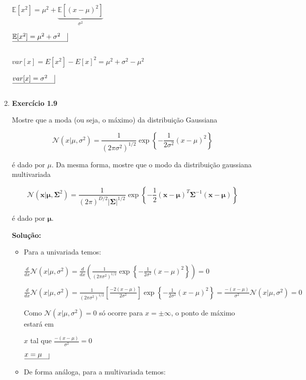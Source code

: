 \begin{enumerate}
$\mathbb{E}[x^2] =\mu^2 + \underbrace{\mathbb{E}[(x-\mu)^2]}_{\sigma^2}$

$\underline{ \mathbb{E}[x^2] =\mu^2 + \sigma^2 \quad} \vline$

$ $

$var[x]=E[x^2]-E[x]^2=\mu^2+\sigma^2-\mu^2$

$\underline{var[x]=\sigma^2 \quad} \vline$

$ $


\item \textbf{Exercício 1.9} \par

Mostre que a moda (ou seja, o máximo) da distribuição Gaussiana 

$$\mathcal{N}(x | \mu, \sigma^2)= \frac{1}{(2\pi\sigma^2)^{1/2}}\exp\left\{ -\frac{1}{2\sigma^2}(x - \mu)^2 \right\}$$

é dado por $\mu$. Da mesma forma, mostre que o modo da distribuição gaussiana multivariada 

$$\mathcal{N}(\boldsymbol{x} | \boldsymbol{\mu}, \boldsymbol{\Sigma}^2)= \frac{1}{(2\pi)^{D/2}|\boldsymbol{\Sigma}|^{1/2}}\exp\left\{ -\frac{1}{2}(\boldsymbol{x} - \boldsymbol{\mu})^T \boldsymbol{\Sigma}^{-1}(\boldsymbol{x} - \boldsymbol{\mu})  \right\}$$

é dado por $\boldsymbol{\mu}$.
\newline \par
\textbf{Solução:}

\begin{itemize}
    \item Para a univariada temos:
    

    $\frac{d}{dx} \mathcal{N}(x|\mu,\sigma^2) = \frac{d}{dx} \left( \frac{1}{(2\pi\sigma^2)^{1/2}}\exp\left\{ -\frac{1}{2\sigma^2}(x - \mu)^2 \right\} \right) = 0$
    
    $\frac{d}{dx} \mathcal{N}(x|\mu,\sigma^2) = \frac{1}{(2\pi\sigma^2)^{1/2}} \left[ \frac{-2(x-\mu)}{2\sigma^2} \right] \exp\left\{ -\frac{1}{2\sigma^2}(x - \mu)^2 \right\} = \frac{-(x-\mu)}{\sigma^2} \mathcal{N}(x|\mu,\sigma^2) = 0$
    
    Como $\mathcal{N}(x|\mu,\sigma^2) = 0$ só ocorre para $x = \pm \infty$, o ponto de máximo estará em
    
    $x$ tal que $\frac{-(x-\mu)}{\sigma^2} = 0$
    
    $\underline{x=\mu \quad} \vline$
       

    \item De forma análoga, para a multivariada temos:
    


\end{itemize}
\end{enumerate}
